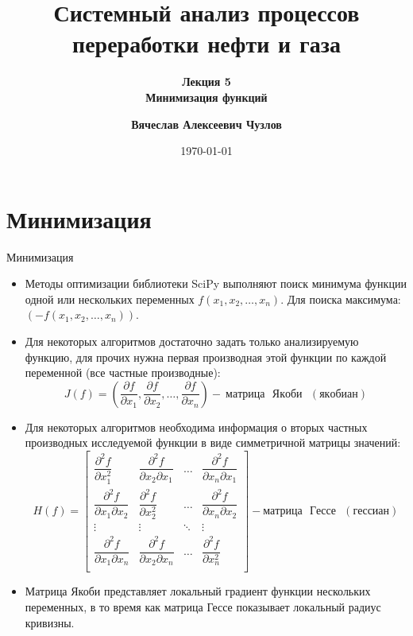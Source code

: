 \documentclass[aspectratio=169, mathserif]{beamer}	%
\title{\Large{Системный анализ процессов переработки нефти и газа}}
\subtitle{\textcolor{tpugreen}{\textbf{Лекция 5}} \\ \textbf{Минимизация функций}}
\author[]{\textbf{Вячеслав Алексеевич Чузлов}}
\institute{к.т.н., доцент ОХИ ИШПР}
\date{\today}
\begin{document}

\titleframe		%

\tocframe{}		%


\section{Минимизация}
\sectionframe

\begin{frame}[fragile]{Минимизация}
\scriptsize
\begin{itemize}
\item Методы оптимизации библиотеки SciPy выполняют поиск минимума функции одной или нескольких переменных $f(x_1, x_2, \dots, x_n)$. Для поиска максимума: $\left(-f(x_1, x_2, \dots, x_n)\right)$.

\item Для некоторых алгоритмов достаточно задать только анализируемую функцию, для прочих нужна первая производная этой функции по каждой переменной (все частные производные):
\vfill
\begin{equation}
	J(f) = \left(\dfrac{\partial f}{\partial x_1}, \dfrac{\partial f}{\partial x_2}, \dots, \dfrac{\partial f}{\partial x_n}\right) - \mathrm{~матрица \text{ } Якоби \text{ } (якобиан)}
\end{equation}
\vfill
\item Для некоторых алгоритмов необходима информация о вторых частных производных исследуемой функции в виде симметричной матрицы значений:
\vfill
\begin{equation}
H(f) =
\begin{bmatrix}
	 \dfrac{\partial^2 f}{\partial x^2_1} & \dfrac{\partial^2 f}{\partial x_2 \partial x_1}
	 & \dots & \dfrac{\partial^2 f}{\partial x_n \partial x_1} \\

	 \dfrac{\partial^2 f}{\partial x_1 \partial x_2} & \dfrac{\partial^2 f}{\partial x^2_2}
	 & \dots & \dfrac{\partial^2 f}{\partial x_n \partial x_2} \\

	 \vdots & \vdots & \ddots & \vdots \\

	 \dfrac{\partial^2 f}{\partial x_1 \partial x_n} & \dfrac{\partial^2 f}{\partial x_2 \partial x_n}
	 & \dots & \dfrac{\partial^2 f}{\partial x^2_n} \\
\end{bmatrix} - \mathrm{матрица \text{ } Гессе \text{ } (гессиан)}
\end{equation}
\vfill
\item Матрица Якоби представляет локальный градиент функции нескольких переменных, в то время как матрица Гессе показывает локальный радиус кривизны.
\end{itemize}
\vfill
\end{frame}
\end{document}
